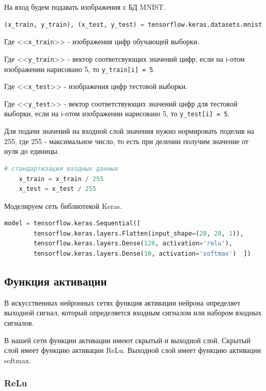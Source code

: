 На вход будем подавать изображения с БД MNIST.

\begin{lstlisting}[language=Python,]
    (x_train, y_train), (x_test, y_test) = tensorflow.keras.datasets.mnist.load_data()
\end{lstlisting}

Где <<\verb|x_train|>> - изображения цифр обучающей выборки.

Где <<\verb|у_train|>> - вектор соответсвующих значений цифр,
если на i-отом изображении нарисовано 5, то \verb|y_train[i] = 5|.

Где <<\verb|x_test|>> - изображения цифр тестовой выборки.

Где <<\verb|у_test|>> - вектор соответствующих значений цифр для тестовой выборки,
если на i-отом изображении нарисовано 5, то \verb|y_test[i] = 5|.

Для подачи значений на входной слой значения нужно нормировать поделив на 255, где 255 - максимальное число, то есть при делении получим значение от нуля до единицы.

\begin{lstlisting}[language=Python,]
    # стандартизация входных данных
    x_train = x_train / 255
    x_test = x_test / 255
\end{lstlisting}

Моделируем сеть библиотекой Keras.

\begin{lstlisting}[language=Python,]
    model = tensorflow.keras.Sequential([
        tensorflow.keras.layers.Flatten(input_shape=(28, 28, 1)),
        tensorflow.keras.layers.Dense(128, activation='relu'),
        tensorflow.keras.layers.Dense(10, activation='softmax')  ])
\end{lstlisting}

\newpage

\subsection{Функция активации}

В искусственных нейронных сетях функция активации нейрона определяет выходной сигнал,
который определяется входным сигналом или набором входных сигналов.

В нашей сети функции активации имеют скрытый и выходной слой.
Скрытый слой имеет функцию активации ReLu.
Выходной слой имеет функцию активации softmax.

\subsubsection{ReLu}

